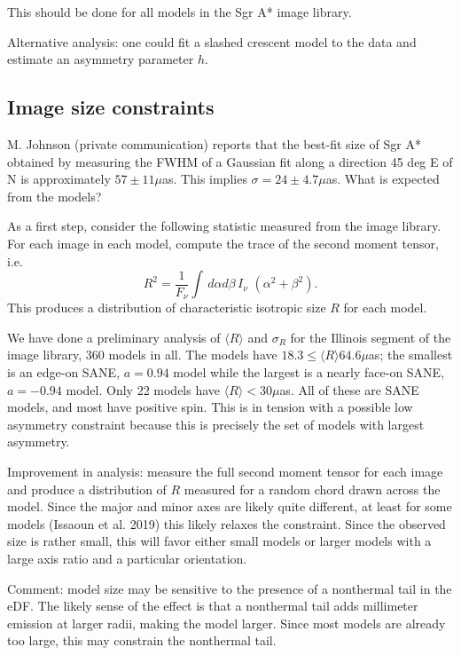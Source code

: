 \documentclass[twocolumn,tighten]{aastex63}
\newcommand\<{{\langle}}
\renewcommand\>{{\rangle}} %
\begin{document}
This should be done for all models in the Sgr A* image library.

Alternative analysis: one could fit a slashed crescent model to the data and estimate an asymmetry parameter $h$.

\subsection{Image size constraints}

M. Johnson (private communication) reports that the best-fit size of Sgr A* obtained by measuring the FWHM of a Gaussian fit along a direction 45 deg E of N is approximately $57 \pm 11 \mu$as.  This implies $\sigma = 24 \pm 4.7 \mu$as.  What is expected from the models?

As a first step, consider the following statistic measured from the image library.  For each image in each model, compute the trace of the second moment tensor, i.e.
\begin{equation}
    R^2 = \frac{1}{F_\nu} \int \, d\alpha d\beta \, I_\nu \,\, (\alpha^2 + \beta^2).
\end{equation}
This produces a distribution of characteristic isotropic size $R$ for each model.

We have done a preliminary analysis of $\langle R \rangle$ and $\sigma_R$ for the Illinois segment of the image library, 360 models in all.  The models have  $18.3 \le \langle R \rangle 64.6 \mu$as; the smallest is an edge-on SANE, $a = 0.94$ model while the largest is a nearly face-on SANE, $a = -0.94$ model.  Only 22 models have $\langle R \rangle < 30\mu$as.  All of these are SANE models, and most have positive spin.  This is in tension with a possible low  asymmetry constraint because this is precisely the set of models with largest asymmetry.

Improvement in analysis: measure the full second moment tensor for each image and produce a distribution of $R$ measured for a random chord drawn across the model.  Since the major and minor axes are likely quite different, at least for some models (Issaoun et al. 2019) this likely relaxes the constraint.  Since the observed size is rather small, this will favor either small models or larger models with a large axis ratio and a particular orientation.

Comment: model size may be sensitive to the presence of a nonthermal tail in the eDF.  The likely sense of the effect is that a nonthermal tail adds millimeter emission at larger radii, making the model larger.  Since most models are already too large, this may constrain the nonthermal tail.
\end{document}
